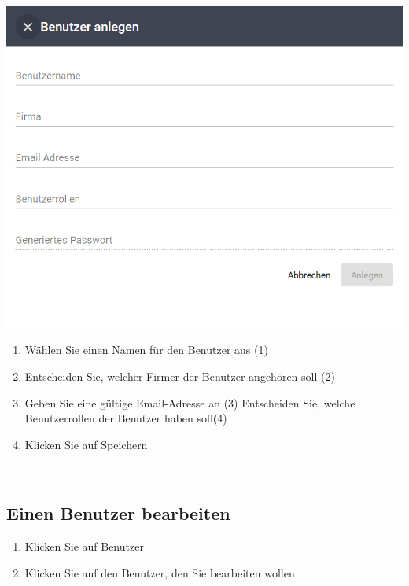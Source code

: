 \documentclass[11pt,a4paper]{report}
\begin{document}
	\begin{minipage}{0.4\linewidth}
	\includegraphics[scale=0.55]{Benutzer.png}
	\end{minipage}
	\hfill
	\begin{minipage}{0.4\linewidth}
	\begin{enumerate}[3]
		\item Wählen Sie einen Namen für den Benutzer aus (1)
		\item Entscheiden Sie, welcher Firmer der Benutzer angehören soll (2)
		\item Geben Sie eine gültige Email-Adresse an (3)
		\iten Entscheiden Sie, welche Benutzerrollen der Benutzer haben soll(4)
		\item Klicken Sie auf Speichern
	\end{enumerate}
	\end{minipage}\\

	\subsection{Einen Benutzer bearbeiten}

		\begin{enumerate}
		\item Klicken Sie auf \glqq{}Benutzer\grqq{}
		\item Klicken Sie auf den Benutzer, den Sie bearbeiten wollen
	\end{enumerate}\\
\end{document}
